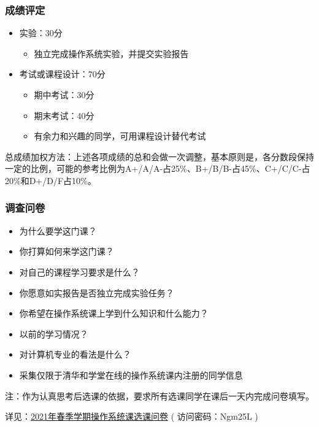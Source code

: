\begin{frame}[fragile]
    \frametitle{成绩评定}
    \begin{itemize}
        \item 实验：30分
        \begin{itemize}
            \item 独立完成操作系统实验，并提交实验报告
        \end{itemize} %
        \item 考试或课程设计：70分
        \begin{itemize}
            \item 期中考试：30分
            \item 期末考试：40分
            \item 有余力和兴趣的同学，可用课程设计替代考试
        \end{itemize}

    \end{itemize} %

    总成绩加权方法：上述各项成绩的总和会做一次调整，基本原则是，各分数段保持一定的比例，可能的参考比例为A+/A/A-占25\%、B+/B/B-占45\%、C+/C/C-占20\%和D+/D/F占10\%。 

\end{frame}

    
    \begin{frame}
        \frametitle{调查问卷}
        \begin{itemize}
            \item 为什么要学这门课？ %
            \item 你打算如何来学这门课？
            \item 对自己的课程学习要求是什么？
            \item 你愿意如实报告是否独立完成实验任务？
            \item 你希望在操作系统课上学到什么知识和什么能力？ %
            \item 以前的学习情况？
            \item 对计算机专业的看法是什么？ %
            \item 采集仅限于清华和学堂在线的操作系统课内注册的同学信息
        \end{itemize}
        
    \newline
    \newline
    
    注：作为认真思考后选课的依据，要求所有选课同学在课后一天内完成问卷填写。
    
    详见：\href{http://oscourse2019.mikecrm.com/te8s1h2}{2021年春季学期操作系统课选课问卷} ( 访问密码：Ngm25L )
    
    \end{frame}


